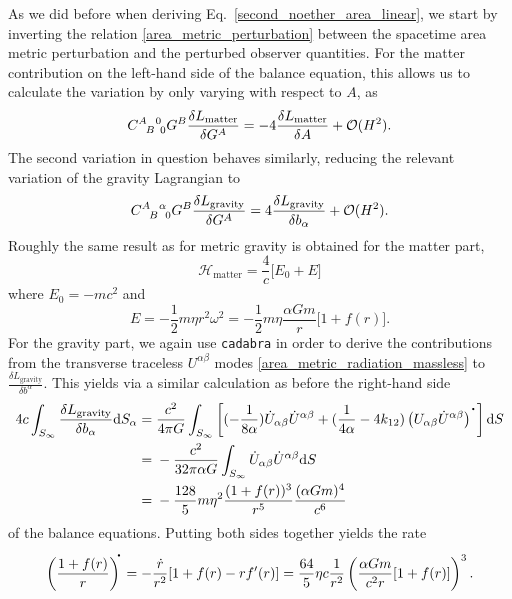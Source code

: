 As we did before when deriving Eq.~\eqref{second_noether_area_linear}, we start by inverting the relation \eqref{area_metric_perturbation} between the spacetime area metric perturbation and the perturbed observer quantities. For the matter contribution on the left-hand side of the balance equation, this allows us to calculate the variation by only varying with respect to $A$, as
\begin{equation}
  \gmc{A}{B}{0}{0}G^B\frac{\delta L_\text{matter}}{\delta G^A} = -4 \frac{\delta L_\text{matter}}{\delta A} + \mathcal O(H^2).
\end{equation}
The second variation in question behaves similarly, reducing the relevant variation of the gravity Lagrangian to
\begin{equation}
  \gmc{A}{B}{\alpha}{0}G^B\frac{\delta L_\text{gravity}}{\delta G^A} = 4 \frac{\delta L_\text{gravity}}{\delta b_\alpha} + \mathcal O(H^2).
\end{equation}
Roughly the same result as for metric gravity is obtained for the matter part,
\begin{equation}
  \mathcal H_\text{matter} = \frac{4}{c}\lbrack E_0 + E\rbrack
\end{equation}
where $E_0 = -mc^2$ and
\begin{equation}
E = -\frac{1}{2} m \eta r^2\omega^2 = -\frac{1}{2} m\eta \frac{\alpha Gm}{r}\lbrack 1+f(r)\rbrack.
\end{equation}
For the gravity part, we again use \texttt{cadabra} in order to derive the contributions from the transverse traceless $U^{\alpha\beta}$ modes \eqref{area_metric_radiation_massless} to $\frac{\delta L_\text{gravity}}{\delta b^\alpha}$. This yields via a similar calculation as before the right-hand side
\begin{equation}
  \begin{aligned}
    4 c \int_{S_\infty} \frac{\delta L_\text{gravity}}{\delta b_\alpha} \mathrm dS_\alpha = {} & \frac{c^2}{4\pi G} \int_{S_\infty} \left\lbrack (-\frac{1}{8\alpha})\dot U_{\alpha\beta}\dot U^{\alpha\beta} + (\frac{1}{4\alpha}-4k_{12})\left(U_{\alpha\beta}\dot U^{\alpha\beta}\right)^{\scalebox{1.5}{$\cdot$}}\right\rbrack \mathrm dS \\
    = {} & -\frac{c^2}{32\pi\alpha G} \int_{S_\infty}\dot U_{\alpha\beta}\dot U^{\alpha\beta}\mathrm dS \\
    = {} & -\frac{128}{5} m \eta^2 \frac{(1+f(r))^3}{r^5}\frac{(\alpha Gm)^4}{c^6}
  \end{aligned}
\end{equation}
of the balance equations. Putting both sides together yields the rate
\begin{equation}\label{area_metric_balance}
  \left(\frac{1+f(r)}{r}\right)^{\!\!\scalebox{1.5}{$\cdot$}} = -\frac{\dot r}{r^2}\lbrack 1+f(r) - r f^\prime(r)\rbrack = \frac{64}{5} \eta c \frac{1}{r^2} \left(\frac{\alpha Gm}{c^2r}\lbrack 1+f(r)\rbrack\right)^3.
\end{equation}

